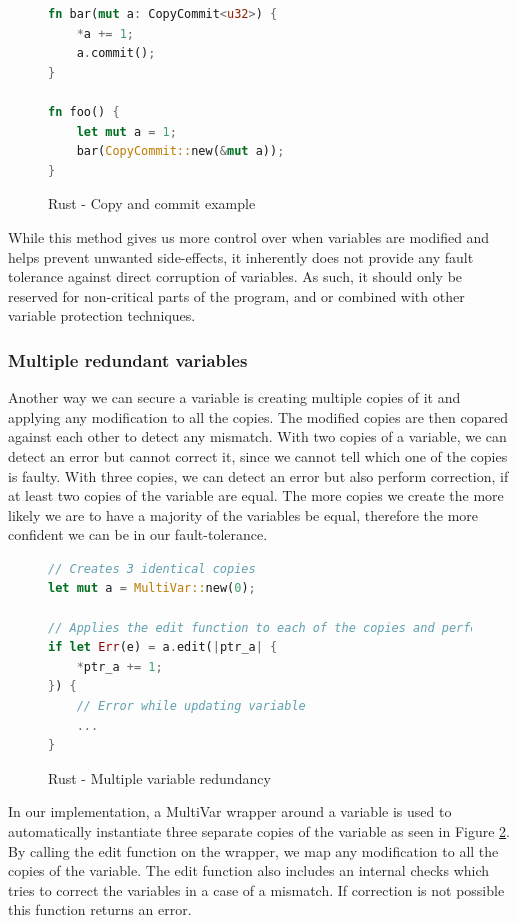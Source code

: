 \documentclass[12pt, letterpaper]{article}
\begin{document}
\begin{figure}[!h]
\begin{lstlisting}[language=Rust]
fn bar(mut a: CopyCommit<u32>) {
    *a += 1;
    a.commit();
}

fn foo() {
    let mut a = 1;
    bar(CopyCommit::new(&mut a));
}
\end{lstlisting}
\caption{Rust - Copy and commit example}
\label{fig:rust_copy_commit}
\end{figure}

While this method gives us more control over when variables are modified and helps prevent unwanted side-effects, it inherently does not provide any fault tolerance against direct corruption of variables. As such, it should only be reserved for non-critical parts of the program, and or combined with other variable protection techniques.

\subsubsection{Multiple redundant variables}

Another way we can secure a variable is creating multiple copies of it and applying any modification to all the copies. The modified copies are then copared against each other to detect any mismatch. With two copies of a variable, we can detect an error but cannot correct it, since we cannot tell which one of the copies is faulty. With three copies, we can detect an error but also perform correction, if at least two copies of the variable are equal. The more copies we create the more likely we are to have a majority of the variables be equal, therefore the more confident we can be in our fault-tolerance.

\begin{figure}[!h]
\begin{lstlisting}[language=Rust]
// Creates 3 identical copies
let mut a = MultiVar::new(0);

// Applies the edit function to each of the copies and performs equality check
if let Err(e) = a.edit(|ptr_a| {
    *ptr_a += 1;
}) {
    // Error while updating variable
    ...
}
\end{lstlisting}
\caption{Rust - Multiple variable redundancy}
\label{fig:multivar}
\end{figure}

In our implementation, a MultiVar wrapper around a variable is used to automatically instantiate three separate copies of the variable as seen in Figure \ref{fig:multivar}. By calling the edit function on the wrapper, we map any modification to all the copies of the variable. The edit function also includes an internal checks which tries to correct the variables in a case of a mismatch. If correction is not possible this function returns an error.
\end{document}
